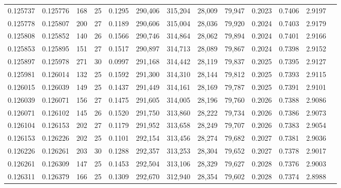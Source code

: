 \begin{tabular}{rrrrrrrrrrrrr}
0.125737 & 0.125776 & 168 &  25 &                                     0.1295 & 290,406 & 315,204 &  28,009 &  79,947 & 0.2023 & 0.7406 & 2.9197 \\
0.125778 & 0.125807 & 200 &  27 &                                     0.1189 & 290,606 & 315,004 &  28,036 &  79,920 & 0.2024 & 0.7403 & 2.9179 \\
0.125808 & 0.125852 & 140 &  26 &                                     0.1566 & 290,746 & 314,864 &  28,062 &  79,894 & 0.2024 & 0.7401 & 2.9166 \\
0.125853 & 0.125895 & 151 &  27 &                                     0.1517 & 290,897 & 314,713 &  28,089 &  79,867 & 0.2024 & 0.7398 & 2.9152 \\
0.125897 & 0.125978 & 271 &  30 &                                     0.0997 & 291,168 & 314,442 &  28,119 &  79,837 & 0.2025 & 0.7395 & 2.9127 \\
0.125981 & 0.126014 & 132 &  25 &                                     0.1592 & 291,300 & 314,310 &  28,144 &  79,812 & 0.2025 & 0.7393 & 2.9115 \\
0.126015 & 0.126039 & 149 &  25 &                                     0.1437 & 291,449 & 314,161 &  28,169 &  79,787 & 0.2025 & 0.7391 & 2.9101 \\
0.126039 & 0.126071 & 156 &  27 &                                     0.1475 & 291,605 & 314,005 &  28,196 &  79,760 & 0.2026 & 0.7388 & 2.9086 \\
0.126071 & 0.126102 & 145 &  26 &                                     0.1520 & 291,750 & 313,860 &  28,222 &  79,734 & 0.2026 & 0.7386 & 2.9073 \\
0.126104 & 0.126153 & 202 &  27 &                                     0.1179 & 291,952 & 313,658 &  28,249 &  79,707 & 0.2026 & 0.7383 & 2.9054 \\
0.126153 & 0.126226 & 202 &  25 &                                     0.1101 & 292,154 & 313,456 &  28,274 &  79,682 & 0.2027 & 0.7381 & 2.9036 \\
0.126226 & 0.126261 & 203 &  30 &                                     0.1288 & 292,357 & 313,253 &  28,304 &  79,652 & 0.2027 & 0.7378 & 2.9017 \\
0.126261 & 0.126309 & 147 &  25 &                                     0.1453 & 292,504 & 313,106 &  28,329 &  79,627 & 0.2028 & 0.7376 & 2.9003 \\
0.126311 & 0.126379 & 166 &  25 &                                     0.1309 & 292,670 & 312,940 &  28,354 &  79,602 & 0.2028 & 0.7374 & 2.8988 \\

\end{tabular}
